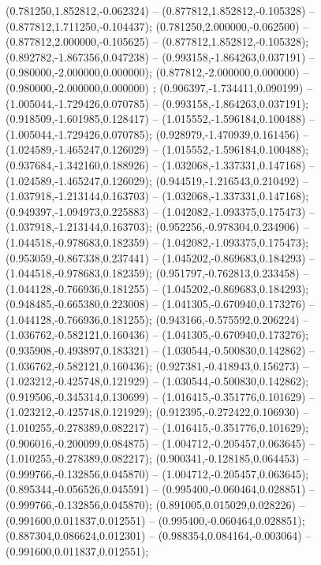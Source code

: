  (0.781250,1.852812,-0.062324) -- (0.877812,1.852812,-0.105328) -- (0.877812,1.711250,-0.104437);
 (0.781250,2.000000,-0.062500) -- (0.877812,2.000000,-0.105625) -- (0.877812,1.852812,-0.105328);
 (0.892782,-1.867356,0.047238) -- (0.993158,-1.864263,0.037191) -- (0.980000,-2.000000,0.000000);
 (0.877812,-2.000000,0.000000) -- (0.980000,-2.000000,0.000000) ;
 (0.906397,-1.734411,0.090199) -- (1.005044,-1.729426,0.070785) -- (0.993158,-1.864263,0.037191);
 (0.918509,-1.601985,0.128417) -- (1.015552,-1.596184,0.100488) -- (1.005044,-1.729426,0.070785);
 (0.928979,-1.470939,0.161456) -- (1.024589,-1.465247,0.126029) -- (1.015552,-1.596184,0.100488);
 (0.937684,-1.342160,0.188926) -- (1.032068,-1.337331,0.147168) -- (1.024589,-1.465247,0.126029);
 (0.944519,-1.216543,0.210492) -- (1.037918,-1.213144,0.163703) -- (1.032068,-1.337331,0.147168);
 (0.949397,-1.094973,0.225883) -- (1.042082,-1.093375,0.175473) -- (1.037918,-1.213144,0.163703);
 (0.952256,-0.978304,0.234906) -- (1.044518,-0.978683,0.182359) -- (1.042082,-1.093375,0.175473);
 (0.953059,-0.867338,0.237441) -- (1.045202,-0.869683,0.184293) -- (1.044518,-0.978683,0.182359);
 (0.951797,-0.762813,0.233458) -- (1.044128,-0.766936,0.181255) -- (1.045202,-0.869683,0.184293);
 (0.948485,-0.665380,0.223008) -- (1.041305,-0.670940,0.173276) -- (1.044128,-0.766936,0.181255);
 (0.943166,-0.575592,0.206224) -- (1.036762,-0.582121,0.160436) -- (1.041305,-0.670940,0.173276);
 (0.935908,-0.493897,0.183321) -- (1.030544,-0.500830,0.142862) -- (1.036762,-0.582121,0.160436);
 (0.927381,-0.418943,0.156273) -- (1.023212,-0.425748,0.121929) -- (1.030544,-0.500830,0.142862);
 (0.919506,-0.345314,0.130699) -- (1.016415,-0.351776,0.101629) -- (1.023212,-0.425748,0.121929);
 (0.912395,-0.272422,0.106930) -- (1.010255,-0.278389,0.082217) -- (1.016415,-0.351776,0.101629);
 (0.906016,-0.200099,0.084875) -- (1.004712,-0.205457,0.063645) -- (1.010255,-0.278389,0.082217);
 (0.900341,-0.128185,0.064453) -- (0.999766,-0.132856,0.045870) -- (1.004712,-0.205457,0.063645);
 (0.895344,-0.056526,0.045591) -- (0.995400,-0.060464,0.028851) -- (0.999766,-0.132856,0.045870);
 (0.891005,0.015029,0.028226) -- (0.991600,0.011837,0.012551) -- (0.995400,-0.060464,0.028851);
 (0.887304,0.086624,0.012301) -- (0.988354,0.084164,-0.003064) -- (0.991600,0.011837,0.012551);

